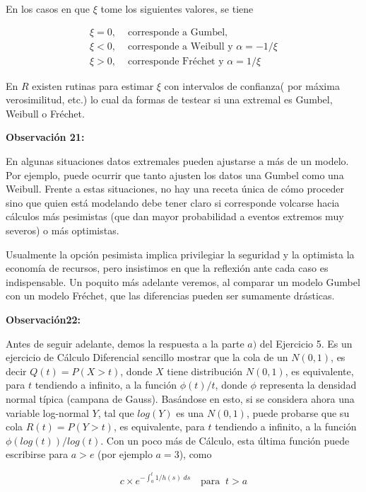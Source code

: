 \documentclass[
  oneside]{article}
\begin{document}
En los casos en que \(\xi\) tome los siguientes valores, se tiene

\begin{align*}
 \xi=0,  & \text{ corresponde a Gumbel,} \\
 \xi< 0, &\text{ corresponde a Weibull y } \alpha=-1/ \xi \\
 \xi>0, &\text{ corresponde Fréchet y }  \alpha=1/ \xi
\end{align*}

En \(R\) existen rutinas para estimar \(\xi\) con intervalos de
confianza( por máxima verosimilitud, etc.) lo cual da formas de testear
si una extremal es Gumbel, Weibull o Fréchet.

\textbf{Observación 21:}

En algunas situaciones datos extremales pueden ajustarse a más de un
modelo. Por ejemplo, puede ocurrir que tanto ajusten los datos una
Gumbel como una Weibull. Frente a estas situaciones, no hay una receta
única de cómo proceder sino que quien está modelando debe tener claro si
corresponde volcarse hacia cálculos más pesimistas (que dan mayor
probabilidad a eventos extremos muy severos) o más optimistas.

Usualmente la opción pesimista implica privilegiar la seguridad y la
optimista la economía de recursos, pero insistimos en que la reflexión
ante cada caso es indispensable. Un poquito más adelante veremos, al
comparar un modelo Gumbel con un modelo Fréchet, que las diferencias
pueden ser sumamente drásticas.

\textbf{Observación22:}

Antes de seguir adelante, demos la respuesta a la parte \(a)\) del
Ejercicio 5. Es un ejercicio de Cálculo Diferencial sencillo mostrar que
la cola de un \(N(0,1)\), es decir \(Q(t)=P(X>t)\), donde \(X\) tiene
distribución \(N(0,1)\), es equivalente, para \(t\) tendiendo a
infinito, a la función \(\phi(t)/t\), donde \(\phi\) representa la
densidad normal típica (campana de Gauss). Basándose en esto, si se
considera ahora una variable log-normal \(Y\), tal que \(log(Y)\) es una
\(N(0,1)\), puede probarse que su cola \(R(t)=P(Y>t)\), es equivalente,
para \(t\) tendiendo a infinito, a la función \(\phi(log(t))/log(t)\).
Con un poco más de Cálculo, esta última función puede escribirse para
\(a>e\) (por ejemplo \(a=3\)), como

\begin{equation}
c\times e^{-\int_{a}^{t}1/h(s)\; ds} \quad \text{para }\: t>a
\end{equation}
\end{document}

